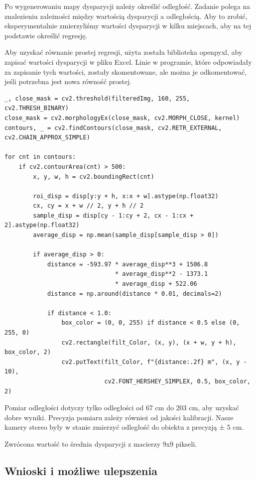 \documentclass[magisterska]{pracadypl}
\begin{document}
Po wygenerowaniu mapy dysparycji należy określić odległość. Zadanie polega na znalezieniu zależności między wartością dysparycji a odległością. Aby to zrobić, eksperymentalnie zmierzyliśmy wartości dysparycji w kilku miejscach, aby na tej podstawie określić regresję.

Aby uzyskać równanie prostej regresji, użyta została biblioteka openpyxl, aby zapisać wartości dysparycji w pliku Excel. Linie w programie, które odpowiadały za zapisanie tych wartości, zostały skomentowane, ale można je odkomentować, jeśli potrzebna jest nowa równość prostej.

\begin{lstlisting}[style=mypython]
_, close_mask = cv2.threshold(filteredImg, 160, 255, cv2.THRESH_BINARY)
close_mask = cv2.morphologyEx(close_mask, cv2.MORPH_CLOSE, kernel)
contours, _ = cv2.findContours(close_mask, cv2.RETR_EXTERNAL, cv2.CHAIN_APPROX_SIMPLE)

for cnt in contours:
    if cv2.contourArea(cnt) > 500:
        x, y, w, h = cv2.boundingRect(cnt)

        roi_disp = disp[y:y + h, x:x + w].astype(np.float32)
        cx, cy = x + w // 2, y + h // 2
        sample_disp = disp[cy - 1:cy + 2, cx - 1:cx + 2].astype(np.float32)
        average_disp = np.mean(sample_disp[sample_disp > 0])

        if average_disp > 0:
            distance = -593.97 * average_disp**3 + 1506.8 
                               * average_disp**2 - 1373.1 
                               * average_disp + 522.06
            distance = np.around(distance * 0.01, decimals=2)

            if distance < 1.0:
                box_color = (0, 0, 255) if distance < 0.5 else (0, 255, 0)
                cv2.rectangle(filt_Color, (x, y), (x + w, y + h), box_color, 2)
                cv2.putText(filt_Color, f"{distance:.2f} m", (x, y - 10),
                            cv2.FONT_HERSHEY_SIMPLEX, 0.5, box_color, 2)
\end{lstlisting}

Pomiar odległości dotyczy tylko odległości od 67 cm do 203 cm, aby uzyskać dobre wyniki. Precyzja pomiaru zależy również od jakości kalibracji. Nasze kamery stereo były w stanie zmierzyć odległość do obiektu z precyzją ± 5 cm.

Zwrócona wartość to średnia dysparycji z macierzy 9x9 pikseli.

\subsection{Wnioski i możliwe ulepszenia}
\end{document}

